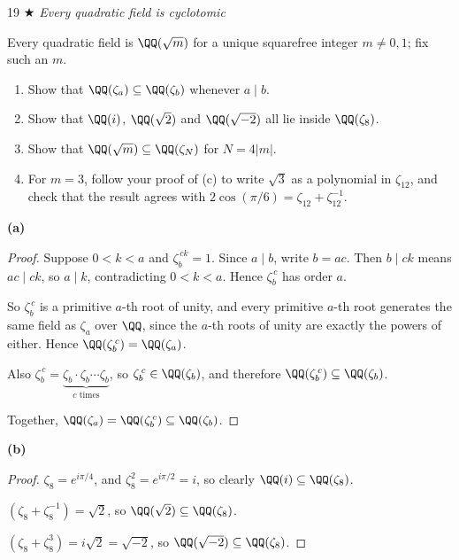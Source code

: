\documentclass[11pt]{article}
\begin{document}
\begin{problem}{19}
  \textit{$\bigstar$ Every quadratic field is cyclotomic}\par
  Every quadratic field is $\QQ(\sqrt m)$ for a unique squarefree integer $m\ne0,1$; fix such an $m$.
  \begin{enumerate}[label=(\alph*)]
    \item Show that $\QQ(\zeta_a)\subseteq\QQ(\zeta_b)$ whenever $a\mid b$.
    \item Show that $\QQ(i)$, $\QQ(\sqrt2)$ and $\QQ(\sqrt{-2})$ all lie inside $\QQ(\zeta_8)$.
    \item Show that $\QQ(\sqrt m)\subseteq\QQ(\zeta_N)$ for $N=4|m|$.
    \item For $m=3$, follow your proof of (c) to write $\sqrt3$ as a polynomial in $\zeta_{12}$, and check that the result agrees with $2\cos(\pi/6)=\zeta_{12}+\zeta_{12}^{-1}$.
  \end{enumerate}
\end{problem}
\noindent\textbf{(a)}
\begin{proof}
Suppose $0<k<a$ and $\zeta_b^{\,ck}=1$. Since $a\mid b$, write $b=ac$. Then $b\mid ck$ means $ac\mid ck$, so $a\mid k$, contradicting $0<k<a$. Hence $\zeta_b^{\,c}$ has order $a$.

So $\zeta_b^{\,c}$ is a primitive $a$-th root of unity, and every primitive $a$-th root generates the same field as $\zeta_a$ over $\QQ$, since the $a$-th roots of unity are exactly the powers of either. Hence $\QQ(\zeta_b^{\,c})=\QQ(\zeta_a)$.

Also $\zeta_b^{\,c}=\underbrace{\zeta_b\cdot\zeta_b\cdots\zeta_b}_{c\text{ times}}$, so $\zeta_b^{\,c}\in\QQ(\zeta_b)$, and therefore $\QQ(\zeta_b^{\,c})\subseteq\QQ(\zeta_b)$.

Together, $\QQ(\zeta_a)=\QQ(\zeta_b^{\,c})\subseteq\QQ(\zeta_b)$.
\end{proof}

\noindent\textbf{(b)}
\begin{proof}
$\zeta_8=e^{i\pi/4}$, and $\zeta_8^2=e^{i\pi/2}=i$, so clearly $\QQ(i)\subseteq\QQ(\zeta_8)$.

$(\zeta_8+\zeta_8^{-1})=\sqrt2$, so $\QQ(\sqrt2)\subseteq\QQ(\zeta_8)$.

$(\zeta_8+\zeta_8^{3})=i\sqrt2=\sqrt{-2}$, so $\QQ(\sqrt{-2})\subseteq\QQ(\zeta_8)$.
\end{proof}
\end{document}
